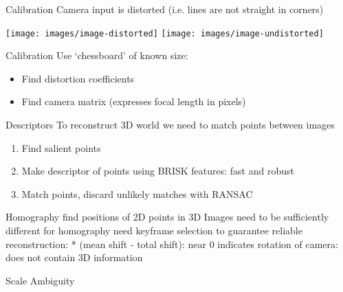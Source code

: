\documentclass{beamer}
\begin{document}
\begin{frame}{Calibration}
	Camera input is distorted (i.e. lines are not straight in corners)

	\begin{center}
		\texttt{[image: images/image-distorted]}
		\texttt{[image: images/image-undistorted]}
	\end{center}
\end{frame}

\begin{frame}{Calibration}
	Use `chessboard' of known size:
	\begin{itemize}
		\item Find distortion coefficients
		\item Find camera matrix (expresses focal length in pixels)
	\end{itemize}

\end{frame}

\begin{frame}{Descriptors}
	To reconstruct 3D world we need to match points between images
	\begin{enumerate}
		\item Find salient points
		\item Make descriptor of points using BRISK features: fast and robust
			\cite{Leutenegger2011}
		\item Match points, discard unlikely matches with RANSAC
			\cite{fischler1981random}
	\end{enumerate}
\end{frame}

\begin{frame}{Homography}
	find positions of 2D points in 3D
	Images need to be sufficiently different for homography
	need keyframe selection to guarantee reliable reconstruction:
	* (mean shift - total shift):
	  near 0 indicates rotation of camera: does not contain 3D information
\end{frame}

\begin{frame}{Scale Ambiguity}
	
\end{frame}
\end{document}
